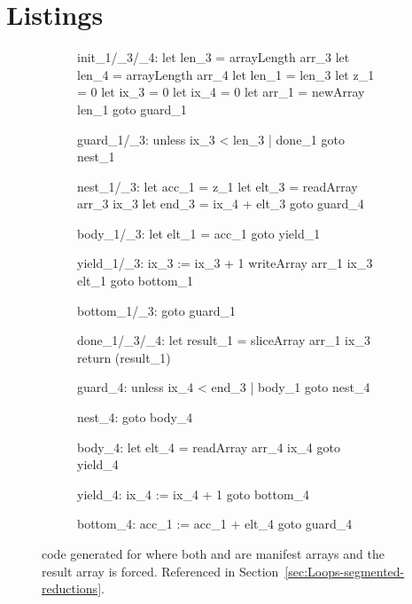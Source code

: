 \documentclass[preamble.tex]{subfiles}
\begin{document}
\clearpage

\chapter{Listings}
\label{ch:listings}


\begin{figure}[h!]

\begin{subfigure}{.55\textwidth}
\begin{loopcode}[%
  literate=
    {_1}{{\sub{fold}}}3
    {_3}{{\sub{segd}}}3
    {_4}{{\sub{data}}}3,
]
init_1/_3/_4:
  let len_3 = arrayLength arr_3
  let len_4 = arrayLength arr_4
  let len_1 = len_3
  let z_1 = 0
  let ix_3 = 0
  let ix_4 = 0
  let arr_1 = newArray len_1
  goto guard_1

guard_1/_3:
  unless ix_3 < len_3 | done_1
  goto nest_1

nest_1/_3:
  let acc_1 = z_1
  let elt_3 = readArray arr_3 ix_3
  let end_3 = ix_4 + elt_3
  goto guard_4

body_1/_3:
  let elt_1 = acc_1
  goto yield_1

yield_1/_3:
  ix_3 := ix_3 + 1
  writeArray arr_1 ix_3 elt_1
  goto bottom_1

bottom_1/_3:
  goto guard_1

done_1/_3/_4:
  let result_1 = sliceArray arr_1 ix_3
  return (result_1)
\end{loopcode}
\end{subfigure}%
%
\begin{subfigure}{.45\textwidth}
\begin{loopcode}[%
  literate=
    {_1}{{\sub{fold}}}3
    {_3}{{\sub{segd}}}3
    {_4}{{\sub{data}}}3,
]
guard_4:
  unless ix_4 < end_3 | body_1
  goto nest_4

nest_4:
  goto body_4

body_4:
  let elt_4 = readArray arr_4 ix_4
  goto yield_4

yield_4:
  ix_4 := ix_4 + 1
  goto bottom_4

bottom_4:
  acc_1 := acc_1 + elt_4
  goto guard_4
\end{loopcode}
\end{subfigure}

\caption{\Loop code generated for  where both  and  are manifest arrays and the result array is forced. Referenced in Section~\ref{sec:Loops-segmented-reductions}.}
\label{fig:Loop-fold-s-complete}
\end{figure}
\end{document}

